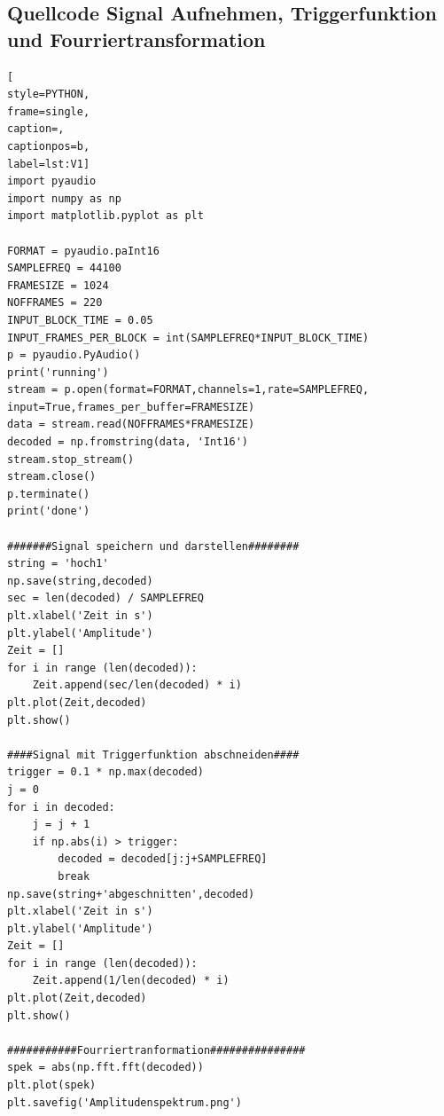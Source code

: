 \documentclass[12pt, oneside, a4paper, \docLanguage]{report}
\begin{document}
\subsection{Quellcode Signal Aufnehmen, Triggerfunktion und Fourriertransformation}
\label{chap:APPENDIX_SOURCECODE_V1}
\begin{lstlisting}[
style=PYTHON,
frame=single,
caption=,
captionpos=b,
label=lst:V1]
import pyaudio 
import numpy as np
import matplotlib.pyplot as plt

FORMAT = pyaudio.paInt16
SAMPLEFREQ = 44100
FRAMESIZE = 1024
NOFFRAMES = 220
INPUT_BLOCK_TIME = 0.05 
INPUT_FRAMES_PER_BLOCK = int(SAMPLEFREQ*INPUT_BLOCK_TIME)
p = pyaudio.PyAudio()
print('running')
stream = p.open(format=FORMAT,channels=1,rate=SAMPLEFREQ, input=True,frames_per_buffer=FRAMESIZE)
data = stream.read(NOFFRAMES*FRAMESIZE) 
decoded = np.fromstring(data, 'Int16')
stream.stop_stream() 
stream.close() 
p.terminate() 
print('done') 

#######Signal speichern und darstellen########
string = 'hoch1'
np.save(string,decoded)
sec = len(decoded) / SAMPLEFREQ
plt.xlabel('Zeit in s')
plt.ylabel('Amplitude')
Zeit = []
for i in range (len(decoded)):
    Zeit.append(sec/len(decoded) * i)
plt.plot(Zeit,decoded) 
plt.show()

####Signal mit Triggerfunktion abschneiden####
trigger = 0.1 * np.max(decoded)
j = 0
for i in decoded:
    j = j + 1
    if np.abs(i) > trigger:
        decoded = decoded[j:j+SAMPLEFREQ]
        break
np.save(string+'abgeschnitten',decoded)
plt.xlabel('Zeit in s')
plt.ylabel('Amplitude')
Zeit = []
for i in range (len(decoded)):
    Zeit.append(1/len(decoded) * i)
plt.plot(Zeit,decoded) 
plt.show()

###########Fourriertranformation###############
spek = abs(np.fft.fft(decoded))
plt.plot(spek)
plt.savefig('Amplitudenspektrum.png')
\end{lstlisting}
\end{document}
